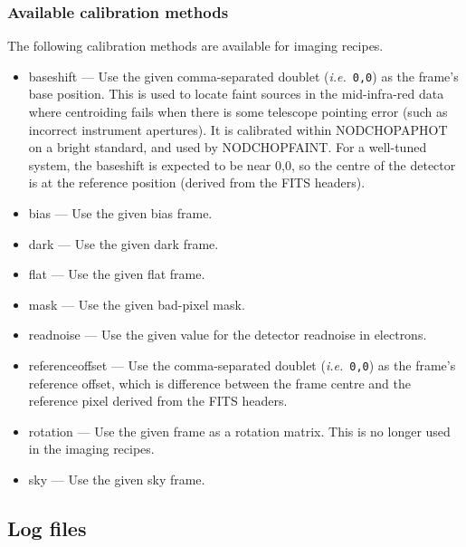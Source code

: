 \documentclass[twoside,11pt]{article}
\newcommand{\htmlref}[2]{#1}
\newcommand{\xlabel}[1]{}
\renewcommand{\_}{\texttt{\symbol{95}}}
\begin{document}
\subsubsection{\xlabel{available_calib}Available calibration methods\label{available_calib}}

The following calibration methods are available for imaging recipes.

\begin{itemize}

\item baseshift --- Use the given comma-separated doublet ({\em{i.e.}}\ {\tt 0,0}) as the
frame's base position.  This is used to locate faint sources in the
mid-infra-red data where centroiding fails when there is some
telescope pointing error (such as incorrect instrument apertures).  It
is calibrated within \htmlref{NOD\_CHOP\_APHOT}{NOD\_CHOP\_APHOT} on a
bright standard, and used by
\htmlref{NOD\_CHOP\_FAINT}{NOD\_CHOP\_FAINT}.  For a well-tuned
system, the baseshift is expected to be near 0,0, so the centre of the
detector is at the reference position (derived from the FITS headers).

\item bias --- Use the given bias frame.

\item dark --- Use the given dark frame.

\item flat --- Use the given flat frame.

\item mask --- Use the given bad-pixel mask.

\item readnoise --- Use the given value for the detector readnoise in
electrons.

\item referenceoffset --- Use the comma-separated doublet
({\em{i.e.}}\ {\tt 0,0}) as the frame's reference offset, which is 
difference between the frame centre and the reference pixel derived
from the FITS headers.

\item rotation --- Use the given frame as a rotation matrix.  This is
no longer used in the imaging recipes.

\item sky --- Use the given sky frame.

\end{itemize}

\subsection{\xlabel{log_files}Log files\label{log_files}}
\end{document}
